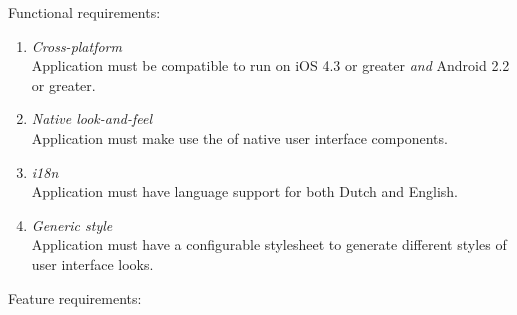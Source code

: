 
Functional requirements:
\begin{enumerate}
\item \emph{Cross-platform}\\Application must be compatible to run on iOS 4.3 or greater \emph{and} Android 2.2 or greater.
\item \emph{Native look-and-feel}\\Application must make use the of native user interface components.
\item \emph{i18n}\\Application must have language support for both Dutch and English.
\item \emph{Generic style}\\Application must have a configurable stylesheet to generate different styles of user interface looks.
\end{enumerate}
\noindent Feature requirements:
